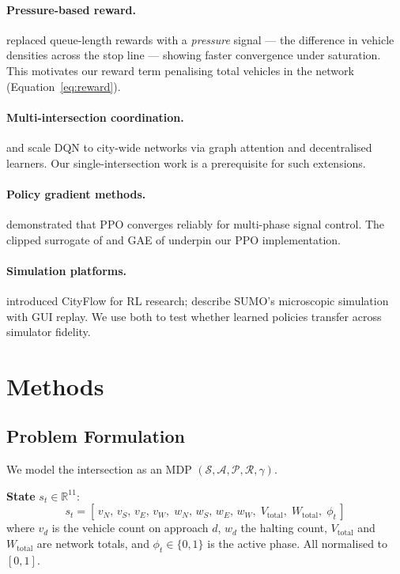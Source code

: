 \documentclass[10pt]{article}
\begin{document}
\paragraph{Pressure-based reward.}
\citet{wei2019presslight} replaced queue-length rewards with a \emph{pressure}
signal — the difference in vehicle densities across the stop line — showing
faster convergence under saturation.  This motivates our reward term penalising
total vehicles in the network (Equation~\ref{eq:reward}).

\paragraph{Multi-intersection coordination.}
\citet{wei2019colight} and \citet{chen2020toward} scale DQN to city-wide
networks via graph attention and decentralised learners.  Our single-intersection
work is a prerequisite for such extensions.

\paragraph{Policy gradient methods.}
\citet{liang2019deep} demonstrated that PPO converges reliably for multi-phase
signal control.  The clipped surrogate of \citet{schulman2017proximal} and
GAE of \citet{schulman2015high} underpin our PPO implementation.

\paragraph{Simulation platforms.}
\citet{zhang2019cityflow} introduced CityFlow for RL research;
\citet{behrisch2011sumo} describe SUMO's microscopic simulation with GUI replay.
We use both to test whether learned policies transfer across simulator fidelity.

\section{Methods}

\subsection{Problem Formulation}

We model the intersection as an MDP
$(\mathcal{S}, \mathcal{A}, \mathcal{P}, \mathcal{R}, \gamma)$.

\textbf{State} $s_t \in \mathbb{R}^{11}$:
\begin{equation}
s_t = [\,v_N,\, v_S,\, v_E,\, v_W,\;
        w_N,\, w_S,\, w_E,\, w_W,\;
        V_{\text{total}},\; W_{\text{total}},\; \phi_t\,]
\end{equation}
where $v_d$ is the vehicle count on approach $d$, $w_d$ the halting count,
$V_{\text{total}}$ and $W_{\text{total}}$ are network totals, and
$\phi_t \in \{0,1\}$ is the active phase.  All normalised to $[0,1]$.
\end{document}
